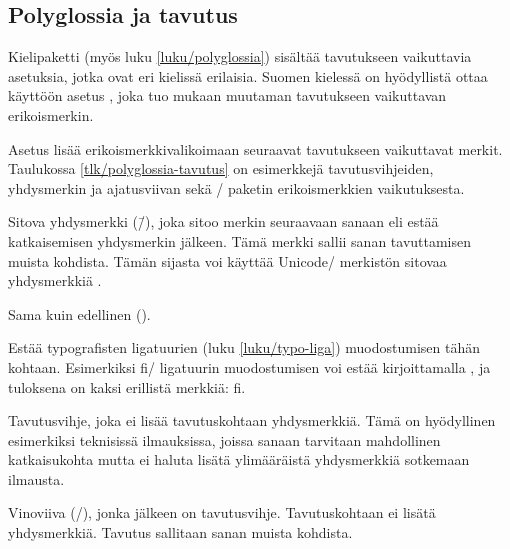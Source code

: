 \subsection{Polyglossia ja tavutus}
\label{luku/tavutus-polyglossia}

Kielipaketti  (myös luku
\ref{luku/polyglossia}) sisältää tavutukseen vaikuttavia asetuksia,
jotka ovat eri kielissä erilaisia. Suomen kielessä on hyödyllistä ottaa
käyttöön asetus , joka tuo mukaan muutaman
tavutukseen vaikuttavan erikoismerkin.

\begin{koodilohkosis}
\setdefaultlanguage[babelshorthands]{finnish}
\end{koodilohkosis}

\noindent
Asetus  lisää erikoismerkkivalikoimaan seuraavat
tavutukseen vaikuttavat merkit. Taulukossa \ref{tlk/polyglossia-tavutus}
on esimerkkejä tavutusvihjeiden, yhdysmerkin ja ajatusviivan sekä
\-/ paketin erikoismerkkien vaikutuksesta.

\newcommand{\shorthandsyhdysmerkki}{%
\item [\textquotedbl-] Sitova yhdysmerkki (\=/), joka sitoo merkin
  seuraavaan sanaan eli estää katkaisemisen yhdysmerkin jälkeen. Tämä
  merkki sallii sanan tavuttamisen muista kohdista. Tämän sijasta voi
  käyttää Unicode\-/ merkistön sitovaa yhdysmerkkiä \uctunnus{u+2011
    non\-/ breaking hyphen}.}

\newcommand{\shorthandspystyviiva}{%
\item [\textquotedbl|] Estää typografisten ligatuurien (luku
  \ref{luku/typo-liga}) muodostumisen tähän kohtaan. Esimerkiksi fi\-/
  ligatuurin muodostumisen voi estää kirjoittamalla \koodi{f"|i}, ja
  tuloksena on kaksi erillistä merkkiä: f\textcompwordmark i.}

\newcommand{\shorthandslainausmerkki}{%
\item [\textquotedbl\textquotedbl] Tavutusvihje, joka ei lisää
  tavutuskohtaan yhdysmerkkiä. Tämä on hyödyllinen esimerkiksi
  teknisissä ilmauksissa, joissa sanaan tarvitaan mahdollinen
  katkaisukohta mutta ei haluta lisätä ylimääräistä yhdysmerkkiä
  sotkemaan ilmausta.}

\begin{maaritelma}{}
  \shorthandsyhdysmerkki

\item [\textquotedbl=] Sama kuin edellinen (\koodi{\textquotedbl-}).

  \shorthandspystyviiva

  \shorthandslainausmerkki

\item [\textquotedbl/] Vinoviiva (/), jonka jälkeen on tavutusvihje.
  Tavutuskohtaan ei lisätä yhdysmerkkiä. Tavutus sallitaan sanan muista
  kohdista.
\end{maaritelma}

